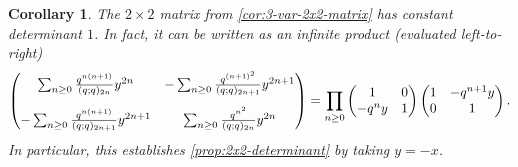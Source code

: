 \documentclass[reqno,11pt]{amsart}
\newtheorem{corollary}[theorem]{Corollary}
\theoremstyle{definition}
\theoremstyle{remark}
\numberwithin{equation}{section}
\begin{document}
\begin{corollary} \label{cor:3-var-2x2-matrix-ctd}
The $2\times 2$ matrix from \cref{cor:3-var-2x2-matrix} has constant determinant $1$. In fact, it can be written as an infinite product (evaluated left-to-right)
\[
\begin{pmatrix}
\sum_{n \ge 0} \frac{q^{n(n+1)}}{(q; q)_{2n}} y^{2n}
& 
-\sum_{n \ge 0} \frac{q^{(n+1)^2}}{(q; q)_{2n+1}} y^{2n+1}
\vspace{0.3cm} 
\\
-\sum_{n \ge 0} \frac{q^{n(n+1)}}{(q; q)_{2n+1}} y^{2n+1}
&
\sum_{n \ge 0} \frac{q^{n^2}}{(q; q)_{2n}} y^{2n}
\end{pmatrix}
=
\prod_{n \ge 0}
\begin{pmatrix}
1 & 0
\\
-q^n y  & 1
\end{pmatrix}
\begin{pmatrix}
1 & -q^{n+1} y
\\
0 & 1
\end{pmatrix}.
\]
In particular, this establishes \cref{prop:2x2-determinant} by taking $y = -x$.
\end{corollary}
\end{document}
